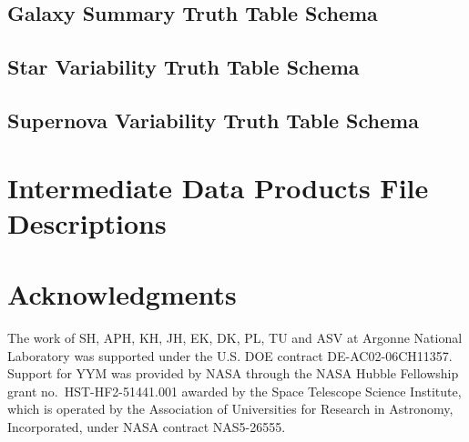 \documentclass[modern]{descnote}
\begin{document}
\bigskip

\subsection{Galaxy Summary Truth Table Schema}
\label{app:galaxy-summary-truth-schema}


\bigskip

\subsection{Star Variability Truth Table Schema}
\label{app:star-variability-truth-schema}


\bigskip

\subsection{Supernova Variability Truth Table Schema}
\label{app:sn-variability-truth-schema}


\bigskip
\section{Intermediate Data Products File Descriptions}
\label{app:intermediate-data-products}



\clearpage
\section*{Acknowledgments}
{}



The work of SH, APH, KH, JH, EK, DK, PL, TU and ASV at Argonne National Laboratory was supported under the U.S. DOE contract DE-AC02-06CH11357.
Support for YYM was provided by NASA through the NASA Hubble Fellowship grant no.\ HST-HF2-51441.001 awarded by the Space Telescope Science Institute, which is operated by the Association of Universities for Research in Astronomy, Incorporated, under NASA contract NAS5-26555. 

\end{document}
